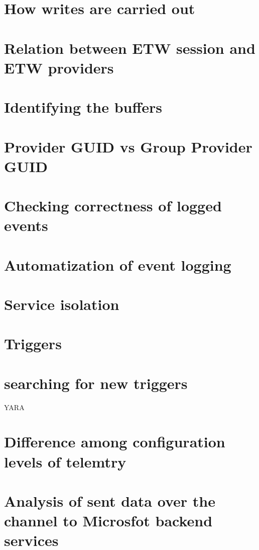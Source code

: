 \section{How writes are carried out}
\section{Relation between ETW session and ETW providers}
\section{Identifying the buffers}
\section{Provider GUID vs Group Provider GUID}
\section{Checking correctness of logged events}
\section{Automatization of event logging}
\section{Service isolation}
\section{Triggers}
\section{searching for new triggers} YARA
\section{Difference among configuration levels of telemtry}
\section{Analysis of sent data over the channel to Microsfot backend services}
